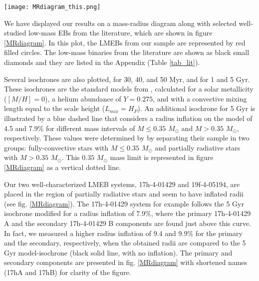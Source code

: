 \documentclass[fleqn,usenatbib]{mnras}
\begin{document}
\begin{figure*}
\begin{center}
\texttt{[image: MRdiagram\_this.png]}\caption{Mass-radius diagram. The isochrones of 30, 40, and 50 Myr and for 1 and 5 Gyr are the standard models from \citet{Baraffe98} ($[M/H]=0$, $Y=0.275$, $L_{mix} = H_{P}$). The additional 5 Gyr inflated evolutionary model was determined by \citet{Knigge11}. The LMEBs from the present work are represented by red filled circles and those gathered from the literature (with errors of less than 6\%) are illustrated as black small diamonds. Note that the EB components are presented here with shortened names for clarity of the figure.} 
\label{MRdiagram}
\end{center}
\end{figure*}


We have displayed our results on a mass-radius diagram along with selected well-studied low-mass EBs from the literature, which are shown in figure \ref{MRdiagram}. In this plot, the LMEBs from our sample are represented by red filled circles. The low-mass binaries from the literature are shown as black small diamonds and they are listed in the Appendix (Table \ref{tab_lit}).

Several isochrones are also plotted, for 30, 40, and 50 Myr, and for 1 and 5 Gyr. These isochrones are the standard models from \citet{Baraffe98}, calculated for a solar metallicity ($[M/H]=0$), a helium abundance of $Y=0.275$, and with a convective mixing length equal to the scale height ($L_{mix} = H_{P}$). 
An additional isochrone for 5 Gyr is illustrated by a blue dashed line that considers a radius inflation on the model of 4.5 and 7.9\% for different mass intervals of $M \leq 0.35$ $M_{\odot}$ and $M > 0.35$ $M_{\odot}$, respectively. These values were determined by \citet{Knigge11} by separating their sample in two groups: fully-convective stars with $M \leq 0.35$ $M_{\odot}$ and partially radiative stars with $M > 0.35$ $M_{\odot}$. This $0.35$ $M_{\odot}$ mass limit is represented in figure \ref{MRdiagram} as a vertical dotted line.

Our two well-characterized LMEB systems, 17h-4-01429 and 19f-4-05194, are placed in the region of partially radiative stars and seem to have inflated radii (see fig. \ref{MRdiagram}). The 17h-4-01429 system for example follows the 5 Gyr isochrone modified for a radius inflation of 7.9\%, where the primary 17h-4-01429 A and the secondary 17h-4-01429 B components are found just above this curve. In fact, we measured a higher radius inflation of 9.4 and 9.9\% for the primary and the secondary, respectively, when the obtained radii are compared to the 5 Gyr model-isochrone (black solid line, with no inflation). The primary and secondary components are presented in fig. \ref{MRdiagram} with shortened names (17hA and 17hB) for clarity of the figure.
\end{document}
